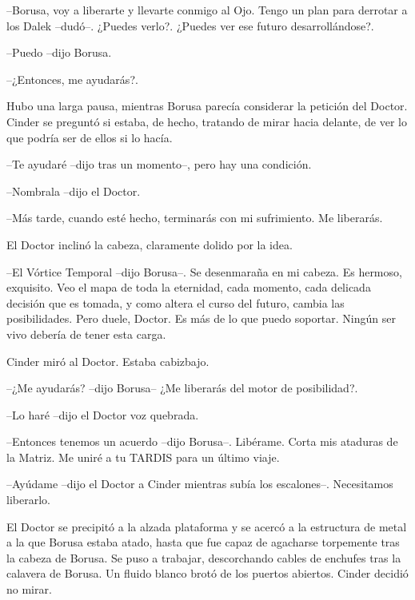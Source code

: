 --Borusa, voy a liberarte y llevarte conmigo al Ojo. Tengo un plan para derrotar a los Dalek --dudó--. ¿Puedes verlo?. ¿Puedes ver ese futuro desarrollándose?.

--Puedo --dijo Borusa.

--¿Entonces, me ayudarás?.



Hubo una larga pausa, mientras Borusa parecía considerar la petición del Doctor. Cinder se preguntó si estaba, de hecho, tratando de mirar hacia delante, de ver lo que podría ser de ellos si lo hacía.



--Te ayudaré --dijo tras un momento--, pero hay una condición.

--Nombrala --dijo el Doctor.

--Más tarde, cuando esté hecho, terminarás con mi sufrimiento. Me liberarás.



El Doctor inclinó la cabeza, claramente dolido por la idea.



--El Vórtice Temporal --dijo Borusa--. Se desenmaraña en mi cabeza. Es hermoso, exquisito. Veo el mapa de toda la eternidad, cada momento, cada delicada decisión que es tomada, y como altera el curso del futuro, cambia las posibilidades. Pero duele, Doctor. Es más de lo que puedo soportar. Ningún ser vivo debería de tener esta carga.



Cinder miró al Doctor. Estaba cabizbajo.



--¿Me ayudarás? --dijo Borusa-- ¿Me liberarás del motor de posibilidad?.

--Lo haré --dijo el Doctor voz quebrada.

--Entonces tenemos un acuerdo --dijo Borusa--. Libérame. Corta mis ataduras de la Matriz. Me uniré a tu TARDIS para un último viaje.

--Ayúdame --dijo el Doctor a Cinder mientras subía los escalones--. Necesitamos liberarlo.



El Doctor se precipitó a la alzada plataforma y se acercó a la estructura de metal a la que Borusa estaba atado, hasta que fue capaz de agacharse torpemente tras la cabeza de Borusa. Se puso a trabajar, descorchando cables de enchufes tras la calavera de Borusa. Un fluido blanco brotó de los puertos abiertos. Cinder decidió no mirar.



